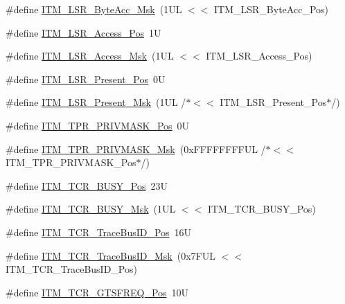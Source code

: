\begin{DoxyCompactItemize}
\#define \hyperlink{group___c_m_s_i_s___i_t_m_ga91f492b2891bb8b7eac5b58de7b220f4}{I\+T\+M\+\_\+\+L\+S\+R\+\_\+\+Byte\+Acc\+\_\+\+Msk}~(1\+U\+L $<$$<$ I\+T\+M\+\_\+\+L\+S\+R\+\_\+\+Byte\+Acc\+\_\+\+Pos)
\item 
\#define \hyperlink{group___c_m_s_i_s___i_t_m_ga144a49e12b83ad9809fdd2769094fdc0}{I\+T\+M\+\_\+\+L\+S\+R\+\_\+\+Access\+\_\+\+Pos}~1U
\item 
\#define \hyperlink{group___c_m_s_i_s___i_t_m_gac8ae69f11c0311da226c0c8ec40b3d37}{I\+T\+M\+\_\+\+L\+S\+R\+\_\+\+Access\+\_\+\+Msk}~(1\+U\+L $<$$<$ I\+T\+M\+\_\+\+L\+S\+R\+\_\+\+Access\+\_\+\+Pos)
\item 
\#define \hyperlink{group___c_m_s_i_s___i_t_m_gaf5740689cf14564d3f3fd91299b6c88d}{I\+T\+M\+\_\+\+L\+S\+R\+\_\+\+Present\+\_\+\+Pos}~0U
\item 
\#define \hyperlink{group___c_m_s_i_s___i_t_m_gaa5bc2a7f5f1d69ff819531f5508bb017}{I\+T\+M\+\_\+\+L\+S\+R\+\_\+\+Present\+\_\+\+Msk}~(1\+U\+L /$\ast$$<$$<$ I\+T\+M\+\_\+\+L\+S\+R\+\_\+\+Present\+\_\+\+Pos$\ast$/)
\item 
\#define \hyperlink{group___c_m_s_i_s___i_t_m_ga7abe5e590d1611599df87a1884a352e8}{I\+T\+M\+\_\+\+T\+P\+R\+\_\+\+P\+R\+I\+V\+M\+A\+S\+K\+\_\+\+Pos}~0U
\item 
\#define \hyperlink{group___c_m_s_i_s___i_t_m_ga168e089d882df325a387aab3a802a46b}{I\+T\+M\+\_\+\+T\+P\+R\+\_\+\+P\+R\+I\+V\+M\+A\+S\+K\+\_\+\+Msk}~(0x\+F\+F\+F\+F\+F\+F\+F\+F\+U\+L /$\ast$$<$$<$ I\+T\+M\+\_\+\+T\+P\+R\+\_\+\+P\+R\+I\+V\+M\+A\+S\+K\+\_\+\+Pos$\ast$/)
\item 
\#define \hyperlink{group___c_m_s_i_s___i_t_m_ga9174ad4a36052c377cef4e6aba2ed484}{I\+T\+M\+\_\+\+T\+C\+R\+\_\+\+B\+U\+S\+Y\+\_\+\+Pos}~23U
\item 
\#define \hyperlink{group___c_m_s_i_s___i_t_m_ga43ad7cf33de12f2ef3a412d4f354c60f}{I\+T\+M\+\_\+\+T\+C\+R\+\_\+\+B\+U\+S\+Y\+\_\+\+Msk}~(1\+U\+L $<$$<$ I\+T\+M\+\_\+\+T\+C\+R\+\_\+\+B\+U\+S\+Y\+\_\+\+Pos)
\item 
\#define \hyperlink{group___c_m_s_i_s___i_t_m_gaca0281de867f33114aac0636f7ce65d3}{I\+T\+M\+\_\+\+T\+C\+R\+\_\+\+Trace\+Bus\+I\+D\+\_\+\+Pos}~16U
\item 
\#define \hyperlink{group___c_m_s_i_s___i_t_m_ga60c20bd9649d1da5a2be8e656ba19a60}{I\+T\+M\+\_\+\+T\+C\+R\+\_\+\+Trace\+Bus\+I\+D\+\_\+\+Msk}~(0x7\+F\+U\+L $<$$<$ I\+T\+M\+\_\+\+T\+C\+R\+\_\+\+Trace\+Bus\+I\+D\+\_\+\+Pos)
\item 
\#define \hyperlink{group___c_m_s_i_s___i_t_m_ga96c7c7cbc0d98426c408090b41f583f1}{I\+T\+M\+\_\+\+T\+C\+R\+\_\+\+G\+T\+S\+F\+R\+E\+Q\+\_\+\+Pos}~10U

\end{DoxyCompactItemize}
